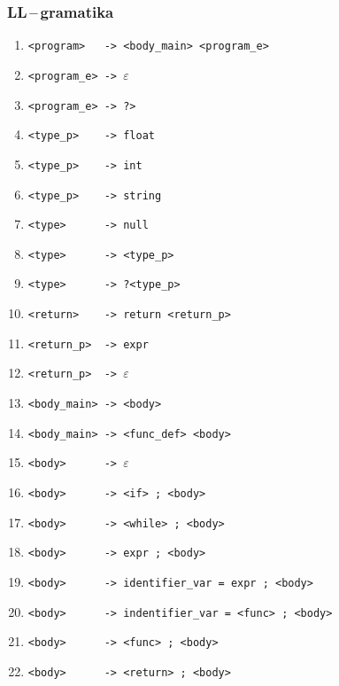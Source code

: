 \documentclass[a4paper,12pt]{article}
\begin{document}
\clearpage

\subsubsection{LL\,--\,gramatika}
\begin{table}[!ht]
	\centering
	\begin{enumerate}[noitemsep]
		\item \verb|<program>   -> <body_main> <program_e>|
		      		      		      		      		      		         
		\item \verb|<program_e> -> |$\varepsilon$
		\item \verb|<program_e> -> ?>|
		      		      		      		      		      		         
		\item \verb|<type_p>    -> float|
		\item \verb|<type_p>    -> int|
		\item \verb|<type_p>    -> string|
		\item \verb|<type>      -> null|
		\item \verb|<type>      -> <type_p>|
		\item \verb|<type>      -> ?<type_p>|
		      		      		      		      		      		      
		\item \verb|<return>    -> return <return_p>|
		\item \verb|<return_p>  -> expr|
		\item \verb|<return_p>  -> |$\varepsilon$
		      		      		      		      		      		         
		\item \verb|<body_main> -> <body>|
		\item \verb|<body_main> -> <func_def> <body>|
		      		      		      		      		      		         
		\item \verb|<body>      -> |$\varepsilon$
		\item \verb|<body>      -> <if> ; <body>|
		\item \verb|<body>      -> <while> ; <body>|
		\item \verb|<body>      -> expr ; <body>|
		\item \verb|<body>      -> identifier_var = expr ; <body>|
		\item \verb|<body>      -> indentifier_var = <func> ; <body>|
		\item \verb|<body>      -> <func> ; <body>|
		\item \verb|<body>      -> <return> ; <body>|
		      		      		      		      		      		         

\end{enumerate}
\end{table}
\end{document}
